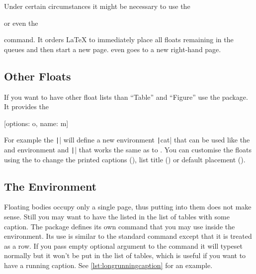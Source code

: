 Under certain circumstances it might be necessary to use the
\begin{lscommand}
   or even the 
\end{lscommand}
command. It orders \LaTeX{} to immediately place all floats remaining in the
queues and then start a new page.  even goes to a new
right-hand page.

\subsection{Other Floats}

If you want to have other float lists than \enquote{Table} and \enquote{Figure}
use the  package. It provides the
\begin{lscommand}
  [options: o, name: m]
\end{lscommand}
For example the \texttt|| will
define a new environment \texttt|cat| that can be used like
the  and  environment and \texttt|\listofcats| that
works the same as to . You can customise the floats using the
 to change the printed captions (), list title
() or default placement ().

\subsection{The  Environment}

Floating bodies occupy only a single page, thus putting  into
them does not make sense. Still you may want to have the  listed
in the list of tables with some caption. The  package defines
its own  command that you may use inside the environment. Its use
is similar to the standard  command except that it is treated as a
row. If you pass empty optional argument to the  command it will
typeset normally but it won't be put in the list of tables, which is useful if
you want to have a running caption. See \autoref{lst:longrunningcaption} for an
example.

